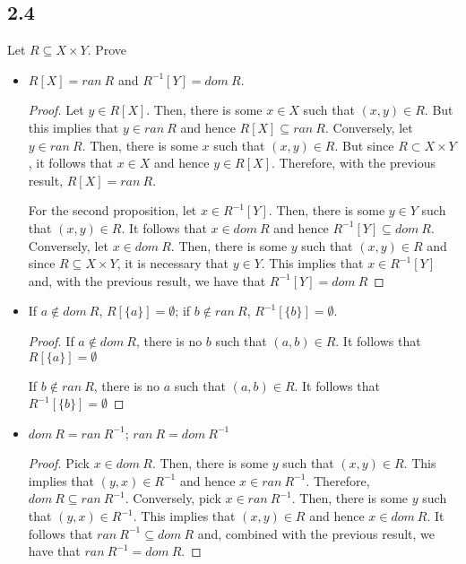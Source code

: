 \subsection*{2.4} Let $R \subseteq X \times Y$. Prove

\begin{itemize}
    \item $R[X] = ran~R$ and $R^{-1}[Y] = dom~R$.
    
    \begin{proof}
    Let $y \in R[X]$. Then, there is some $x \in X$ such that $(x,y) \in R$. But this implies that $y \in ran~R$ and hence $R[X] \subseteq ran~R$. Conversely, let $y \in ran~R$. Then, there is some $x$ such that $(x,y) \in R$. But since $R \subset X \times Y$, it follows that $x \in X$ and hence $y \in R[X]$. Therefore, with the previous result, $R[X] = ran~R$.
    
    \vspace{1em}
    For the second proposition, let $x \in R^{-1}[Y]$. Then, there is some $y \in Y$ such that $(x,y) \in R$. It follows that $x \in dom~R$ and hence $R^{-1}[Y] \subseteq dom~R$. Conversely, let $x \in dom~R$. Then, there is some $y$ such that $(x,y) \in R$ and since $R \subseteq X \times Y$, it is necessary that $y \in Y$. This implies that $x \in R^{-1}[Y]$ and, with the previous result, we have that $R^{-1}[Y] = dom~R$
    \end{proof}
    
    \item If $a \notin dom~R$, $R[\{a\}] = \emptyset$; if $b \notin ran~R$, $R^{-1}[\{b\}]=\emptyset$.
    
    \begin{proof}
    If $a \notin dom~R$, there is no $b$ such that $(a,b) \in R$. It follows that $R[\{a\}] = \emptyset$
    
    If $b \notin ran~R$, there is no $a$ such that $(a, b) \in R$. It follows that $R^{-1}[\{b\}] = \emptyset$
    \end{proof}
    
    \item $dom~R = ran~R^{-1}$; $ran~R = dom~R^{-1}$
    
    \begin{proof}
    Pick $x \in dom~R$. Then, there is some $y$ such that $(x,y) \in R$. This implies that $(y, x) \in R^{-1}$ and hence $x \in ran~R^{-1}$. Therefore, $dom~R \subseteq ran~R^{-1}$. Conversely, pick $x \in ran~R^{-1}$. Then, there is some $y$ such that $(y,x) \in R^{-1}$. This implies that $(x, y) \in R$ and hence $x \in dom~R$. It follows that $ran~R^{-1} \subseteq dom~R$ and, combined with the previous result, we have that $ran~R^{-1} = dom~R$.
    

\end{proof}
\end{itemize}

